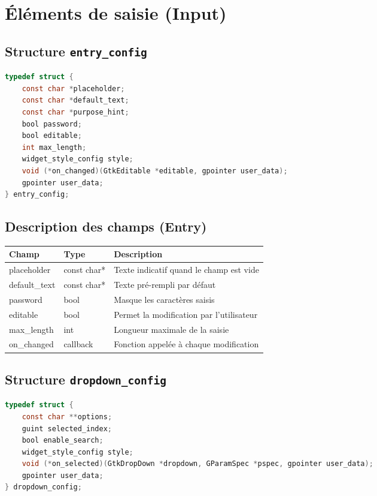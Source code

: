 \section{Éléments de saisie (Input)}

\subsection{Structure \texttt{entry\_config}}
\begin{lstlisting}[language=C]
typedef struct {
    const char *placeholder;
    const char *default_text;
    const char *purpose_hint;
    bool password;
    bool editable;
    int max_length;
    widget_style_config style;
    void (*on_changed)(GtkEditable *editable, gpointer user_data);
    gpointer user_data;
} entry_config;
\end{lstlisting}

\subsection{Description des champs (Entry)}
\begin{center}
\begin{tabular}{|l|l|p{5cm}|}
\hline
\textbf{Champ} & \textbf{Type} & \textbf{Description} \\
\hline
placeholder & const char* & Texte indicatif quand le champ est vide \\
\hline
default\_text & const char* & Texte pré-rempli par défaut \\
\hline
password & bool & Masque les caractères saisis \\
\hline
editable & bool & Permet la modification par l'utilisateur \\
\hline
max\_length & int & Longueur maximale de la saisie \\
\hline
on\_changed & callback & Fonction appelée à chaque modification \\
\hline
\end{tabular}
\end{center}

\subsection{Structure \texttt{dropdown\_config}}
\begin{lstlisting}[language=C]
typedef struct {
    const char **options;
    guint selected_index;
    bool enable_search;
    widget_style_config style;
    void (*on_selected)(GtkDropDown *dropdown, GParamSpec *pspec, gpointer user_data);
    gpointer user_data;
} dropdown_config;
\end{lstlisting}

